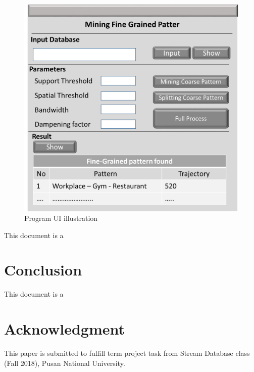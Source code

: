 \documentclass[conference]{IEEEtran}
\begin{document}
\begin{figure}[!ht]
\centering
\includegraphics[width=0.5\linewidth]{GUI}
\caption{Program UI illustration}
\label{fig:javagui}
\end{figure}


This document is a \cite{sdbproject}

\section{Conclusion}
This document is a \cite{zhang2014splitter}

\section*{Acknowledgment}
This paper is submitted to fulfill term project task from Stream Database class (Fall 2018), Pusan National University.



\end{document}
